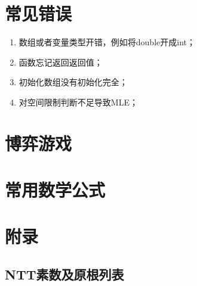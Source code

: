 \documentclass[landscape, oneside, a4paper, cs4size]{book}
\begin{document}
\begin{multicols}{2}
\begin{spacing}{0.72}
\begin{spacing}{0.50}
		\section{常见错误}\footnotesize
		\begin{enumerate}
			\item 数组或者变量类型开错，例如将double开成int；
			\item 函数忘记返回返回值；
			\item 初始化数组没有初始化完全；
			\item 对空间限制判断不足导致MLE；
		\end{enumerate}
		\section{博弈游戏}\footnotesize
		
		\section{常用数学公式}\footnotesize
		
        \end{spacing}
	\end{spacing}
    \section{附录}
    \subsection*{NTT素数及原根列表}
    
    \end{multicols}
\end{document}
